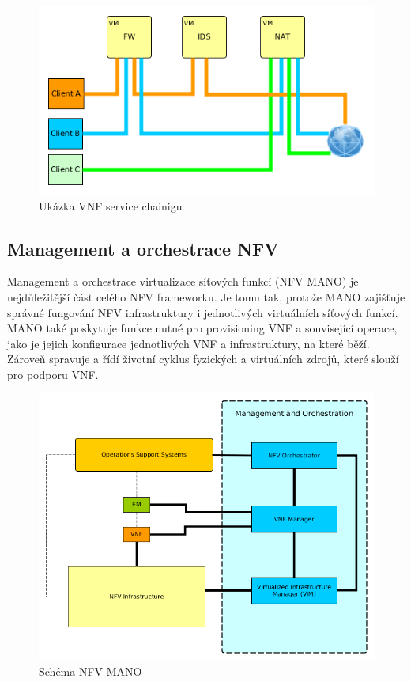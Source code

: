 \begin{figure}[h]
\begin{centering}
\includegraphics[scale=0.55]{images/service_chaining_new}
\par\end{centering}
\caption{Ukázka VNF service chainigu\label{fig:service_chaining_new}}
\end{figure}

\subsection{Management a orchestrace NFV}

Management a orchestrace virtualizace síťových funkcí (NFV MANO) je nejdůležitější část celého NFV frameworku. Je tomu tak, protože MANO zajišťuje správné fungování NFV infrastruktury i jednotlivých virtuálních síťových funkcí. MANO také poskytuje funkce nutné pro provisioning VNF a související operace, jako je jejich konfigurace jednotlivých VNF a infrastruktury, na které běží. Zároveň spravuje a řídí životní cyklus fyzických a virtuálních zdrojů, které slouží pro podporu VNF. \cite{NFV_MANO}

\begin{figure}[h]
\begin{centering}
\includegraphics[scale=0.65]{images/MANO}
\par\end{centering}
\caption{Schéma NFV MANO\label{fig:MANO}}
\end{figure}

